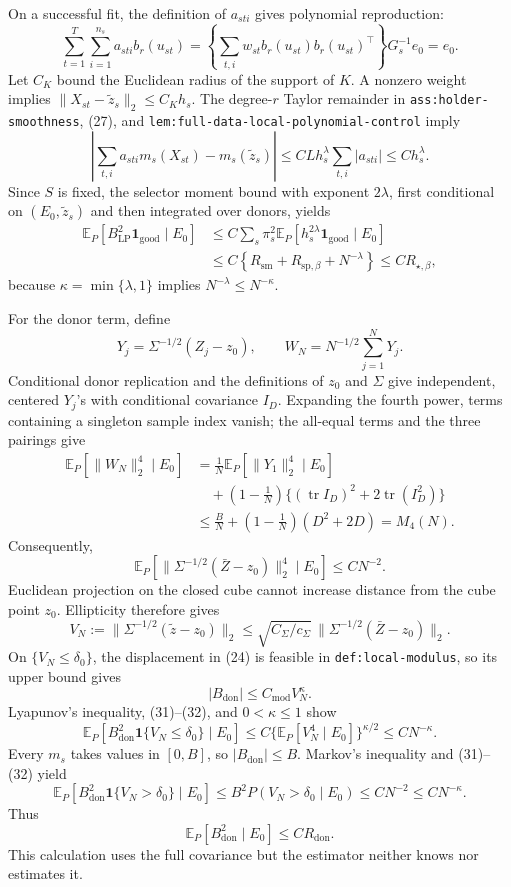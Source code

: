 On a successful fit, the definition of \(a_{sti}\) gives polynomial reproduction:
\[
\sum_{t=1}^{T}\sum_{i=1}^{n_s}a_{sti}b_r(u_{st})
=\left\{\sum_{t,i}w_{st}b_r(u_{st})b_r(u_{st})^\top\right\}G_s^{-1}e_0
=e_0.
\tag{27}
\]
Let \(C_K\) bound the Euclidean radius of the support of \(K\).  A nonzero weight implies
\(\|X_{st}-\widetilde z_s\|_2\leq C_Kh_s\).  The degree-\(r\) Taylor remainder in \texttt{ass:holder-smoothness}, (27), and \texttt{lem:full-data-local-polynomial-control} imply
\[
\left|\sum_{t,i}a_{sti}m_s(X_{st})-m_s(\widetilde z_s)\right|
\leq CLh_s^\lambda\sum_{t,i}|a_{sti}|
\leq Ch_s^\lambda.
\tag{28}
\]
Since \(S\) is fixed, the selector moment bound with exponent \(2\lambda\), first conditional on \((E_0,\widetilde z_s)\) and then integrated over donors, yields
\[
\begin{aligned}
\mathbb E_P[B_{\mathrm{LP}}^2\mathbf1_{\mathrm{good}}\mid E_0]
&\leq C\sum_s\pi_s^2
\mathbb E_P[h_s^{2\lambda}\mathbf1_{\mathrm{good}}\mid E_0]\\
&\leq C\left\{
R_{\mathrm{sm}}+R_{\mathrm{sp},\beta}+N^{-\lambda}\right\}
\leq CR_{\star,\beta},
\end{aligned}
\tag{29}
\]
because \(\kappa=\min\{\lambda,1\}\) implies \(N^{-\lambda}\leq N^{-\kappa}\).

For the donor term, define
\[
Y_j=\Sigma^{-1/2}(Z_j-z_0),
\qquad
W_N=N^{-1/2}\sum_{j=1}^{N}Y_j.
\]
Conditional donor replication and the definitions of \(z_0\) and \(\Sigma\) give independent, centered \(Y_j\)'s with conditional covariance \(I_D\).  Expanding the fourth power, terms containing a singleton sample index vanish; the all-equal terms and the three pairings give
\[
\begin{aligned}
\mathbb E_P[\|W_N\|_2^4\mid E_0]
&=\frac1N\mathbb E_P[\|Y_1\|_2^4\mid E_0]\\
&\quad+\left(1-\frac1N\right)
\{(\operatorname{tr}I_D)^2+2\operatorname{tr}(I_D^2)\}\\
&\leq\frac BN+\left(1-\frac1N\right)(D^2+2D)=M_4(N).
\end{aligned}
\tag{30}
\]
Consequently,
\[
\mathbb E_P[\|\Sigma^{-1/2}(\bar Z-z_0)\|_2^4\mid E_0]
\leq CN^{-2}.
\tag{31}
\]
Euclidean projection on the closed cube cannot increase distance from the cube point \(z_0\).  Ellipticity therefore gives
\[
V_N:=\|\Sigma^{-1/2}(\widetilde z-z_0)\|_2
\leq\sqrt{C_\Sigma/c_\Sigma}\,
\|\Sigma^{-1/2}(\bar Z-z_0)\|_2.
\tag{32}
\]
On \(\{V_N\leq\delta_0\}\), the displacement in (24) is feasible in \texttt{def:local-modulus}, so its upper bound gives
\[
|B_{\mathrm{don}}|\leq C_{\mathrm{mod}}V_N^\kappa.
\]
Lyapunov's inequality, (31)--(32), and \(0<\kappa\leq1\) show
\[
\mathbb E_P[B_{\mathrm{don}}^2\mathbf1\{V_N\leq\delta_0\}\mid E_0]
\leq C\{\mathbb E_P[V_N^4\mid E_0]\}^{\kappa/2}
\leq CN^{-\kappa}.
\tag{33}
\]
Every \(m_s\) takes values in \([0,B]\), so \(|B_{\mathrm{don}}|\leq B\).  Markov's inequality and (31)--(32) yield
\[
\mathbb E_P[B_{\mathrm{don}}^2\mathbf1\{V_N>\delta_0\}\mid E_0]
\leq B^2P(V_N>\delta_0\mid E_0)
\leq CN^{-2}\leq CN^{-\kappa}.
\tag{34}
\]
Thus
\[
\mathbb E_P[B_{\mathrm{don}}^2\mid E_0]\leq CR_{\mathrm{don}}.
\tag{35}
\]
This calculation uses the full covariance but the estimator neither knows nor estimates it.


